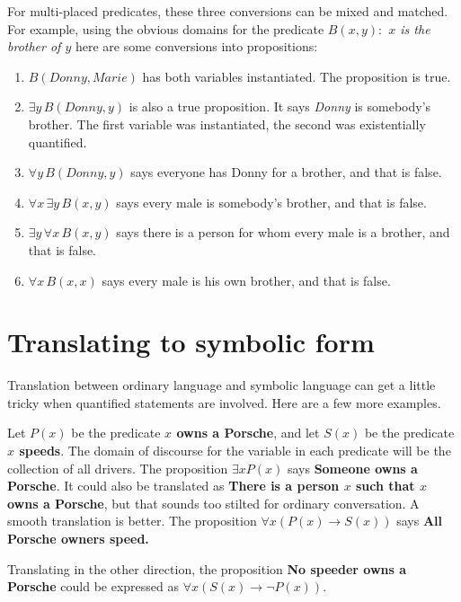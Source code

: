 For multi-placed predicates, these three conversions can be mixed and matched. For example,
using the obvious domains for the predicate {\itshape $B(x,y) : $ $x$ is the 
brother of $y$} here are some conversions into propositions:

\begin{enumerate}
\item $B(Donny, Marie)$ has both variables instantiated. The proposition is true.

\item $\exists y\, B(Donny, y)$ is also a true proposition. It says {\itshape Donny} is
somebody's brother. The first variable was instantiated, the second was existentially
quantified.

\item $\forall y\, B(Donny,y)$ says everyone has Donny for a brother, and that is false.

\item $\forall x\, \exists y\, B(x,y)$ says every male is somebody's brother, and that is false.

\item $\exists y\,\forall x\, B(x,y)$ says there is a person for whom every male is a brother, and that is false.

\item $\forall x\, B(x,x)$ says every male is his own brother, and that is false.
\end{enumerate}


\section{Translating to symbolic form}
Translation between ordinary language and symbolic language can get a little tricky when
quantified statements are involved. Here are a few more examples.

\begin{exmp}\label{exmp:Porche}
Let $P(x)$ be the predicate \textbf{$x$ owns a Porsche}, and
let $S(x)$ be the predicate \textbf{$x$ speeds}. The domain of discourse for the variable
in each predicate will be the collection of all drivers. The proposition $\exists x P(x)$ says
\textbf{Someone owns a Porsche}.  It could also be translated as \textbf{There
is a person $x$ such that $x$ owns a Porsche}, but that sounds too stilted for ordinary
conversation. A smooth translation is better. The proposition $\forall x (P(x)\to S(x))$
says \textbf{All Porsche owners speed.} 

Translating in the other direction, 
the proposition \textbf{No speeder owns a Porsche} could be expressed
as $\forall x (S(x) \to \lnot P(x))$.
\end{exmp}

